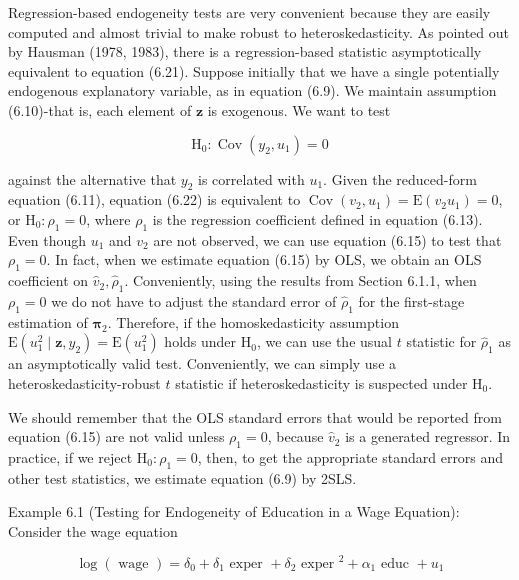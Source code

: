 \documentclass[10pt]{article}
\begin{document}
Regression-based endogeneity tests are very convenient because they are easily computed and almost trivial to make robust to heteroskedasticity. As pointed out by Hausman (1978, 1983), there is a regression-based statistic asymptotically equivalent to equation (6.21). Suppose initially that we have a single potentially endogenous explanatory variable, as in equation (6.9). We maintain assumption (6.10)-that is, each element of $\mathbf{z}$ is exogenous. We want to test


\begin{equation*}
\mathrm{H}_{0}: \operatorname{Cov}\left(y_{2}, u_{1}\right)=0 \tag{6.22}
\end{equation*}


against the alternative that $y_{2}$ is correlated with $u_{1}$. Given the reduced-form equation (6.11), equation (6.22) is equivalent to $\operatorname{Cov}\left(v_{2}, u_{1}\right)=\mathrm{E}\left(v_{2} u_{1}\right)=0$, or $\mathrm{H}_{0}: \rho_{1}=0$, where $\rho_{1}$ is the regression coefficient defined in equation (6.13). Even though $u_{1}$ and $v_{2}$ are not observed, we can use equation (6.15) to test that $\rho_{1}=0$. In fact, when we estimate equation (6.15) by OLS, we obtain an OLS coefficient on $\hat{v}_{2}, \hat{\rho}_{1}$. Conveniently, using the results from Section 6.1.1, when $\rho_{1}=0$ we do not have to adjust the standard error of $\hat{\rho}_{1}$ for the first-stage estimation of $\boldsymbol{\pi}_{2}$. Therefore, if the homoskedasticity assumption $\mathrm{E}\left(u_{1}^{2} \mid \mathbf{z}, y_{2}\right)=\mathrm{E}\left(u_{1}^{2}\right)$ holds under $\mathrm{H}_{0}$, we can use the usual $t$ statistic for $\hat{\rho}_{1}$ as an asymptotically valid test. Conveniently, we can simply use a heteroskedasticity-robust $t$ statistic if heteroskedasticity is suspected under $\mathrm{H}_{0}$.

We should remember that the OLS standard errors that would be reported from equation (6.15) are not valid unless $\rho_{1}=0$, because $\hat{v}_{2}$ is a generated regressor. In practice, if we reject $\mathrm{H}_{0}: \rho_{1}=0$, then, to get the appropriate standard errors and other test statistics, we estimate equation (6.9) by 2SLS.

Example 6.1 (Testing for Endogeneity of Education in a Wage Equation): Consider the wage equation


\begin{equation*}
\log (\text { wage })=\delta_{0}+\delta_{1} \text { exper }+\delta_{2} \text { exper }^{2}+\alpha_{1} \text { educ }+u_{1} \tag{6.23}
\end{equation*}
\end{document}
